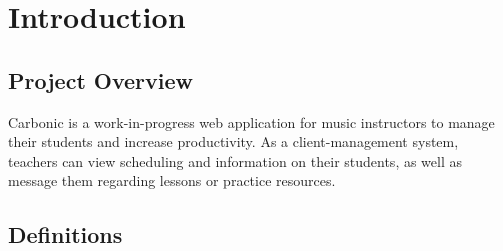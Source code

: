 
\section{Introduction}\label{sec:introduction}

    \subsection{Project Overview}
        Carbonic is a work-in-progress web application for music instructors to manage their students and increase productivity. As a client-management system, teachers can view scheduling and information on their students, as well as message them regarding lessons or practice resources. 

    \subsection{Definitions}\label{sec:definitions}
        \printnoidxglossary
        \printnoidxglossary[type=acronym, title=Acronyms and Abbreviations]
        \printacronyms


